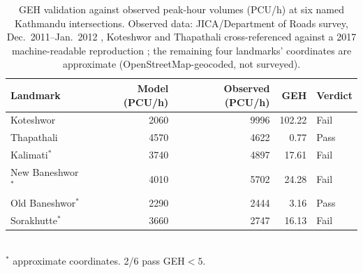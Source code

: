 \begin{table}[htbp]
\centering
\caption{GEH validation against observed peak-hour volumes (PCU/h) at six named Kathmandu intersections. Observed data: JICA/Department of Roads survey, Dec.\ 2011--Jan.\ 2012 \cite{jica2012}, Koteshwor and Thapathali cross-referenced against a 2017 machine-readable reproduction \cite{jica2017}; the remaining four landmarks' coordinates are approximate (OpenStreetMap-geocoded, not surveyed).}
\label{tab:geh}
\begin{tabular}{lrrrl}
\hline
Landmark & Model (PCU/h) & Observed (PCU/h) & GEH & Verdict \\
\hline
Koteshwor & 2060 & 9996 & 102.22 & Fail \\
Thapathali & 4570 & 4622 & 0.77 & Pass \\
Kalimati$^{*}$ & 3740 & 4897 & 17.61 & Fail \\
New Baneshwor$^{*}$ & 4010 & 5702 & 24.28 & Fail \\
Old Baneshwor$^{*}$ & 2290 & 2444 & 3.16 & Pass \\
Sorakhutte$^{*}$ & 3660 & 2747 & 16.13 & Fail \\
\hline
\end{tabular}
\\[2pt] {\footnotesize $^{*}$ approximate coordinates. 2/6 pass GEH$<5$.}
\end{table}
